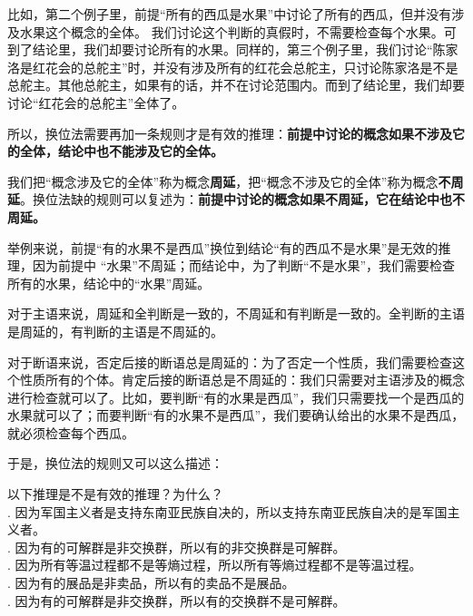 \documentclass[12pt,UTF8,fontset=none]{ctexbook}
\begin{document}
比如，第二个例子里，前提“所有的西瓜是水果”中讨论了所有的西瓜，但并没有涉及水果这个概念的全体。
我们讨论这个判断的真假时，不需要检查每个水果。可到了结论里，我们却要讨论所有的水果。同样的，第三个例子里，我们讨论“陈家洛是红花会的总舵主”时，并没有涉及所有的红花会总舵主，只讨论陈家洛是不是总舵主。其他总舵主，如果有的话，并不在讨论范围内。而到了结论里，我们却要讨论“红花会的总舵主”全体了。

所以，换位法需要再加一条规则才是有效的推理：\textbf{前提中讨论的概念如果不涉及它的全体，结论中也不能涉及它的全体。}

我们把“概念涉及它的全体”称为概念\textbf{周延}，把“概念不涉及它的全体”称为概念\textbf{不周延}。换位法缺的规则可以复述为：\textbf{前提中讨论的概念如果不周延，它在结论中也不周延。}

举例来说，前提“有的水果不是西瓜”换位到结论“有的西瓜不是水果”是无效的推理，因为前提中
“水果”不周延；而结论中，为了判断“不是水果”，我们需要检查所有的水果，结论中的“水果”周延。

对于主语来说，周延和全判断是一致的，不周延和有判断是一致的。全判断的主语是周延的，有判断的主语是不周延的。

对于断语来说，否定后接的断语总是周延的：为了否定一个性质，我们需要检查这个性质所有的个体。肯定后接的断语总是不周延的：我们只需要对主语涉及的概念进行检查就可以了。比如，要判断“有的水果是西瓜”，我们只需要找一个是西瓜的水果就可以了；而要判断“有的水果不是西瓜”，我们要确认给出的水果不是西瓜，就必须检查每个西瓜。

于是，换位法的规则又可以这么描述：
\begin{center}
\end{center}

\begin{xt}\label{xt:2b-1-0}
    以下推理是不是有效的推理？为什么？\\
    . 因为军国主义者是支持东南亚民族自决的，所以支持东南亚民族自决的是军国主义者。 \\
    . 因为有的可解群是非交换群，所以有的非交换群是可解群。 \\
    . 因为所有等温过程都不是等熵过程，所以所有等熵过程都不是等温过程。 \\
    . 因为有的展品是非卖品，所以有的卖品不是展品。 \\
    . 因为有的可解群是非交换群，所以有的交换群不是可解群。
\end{xt}
\end{document}
